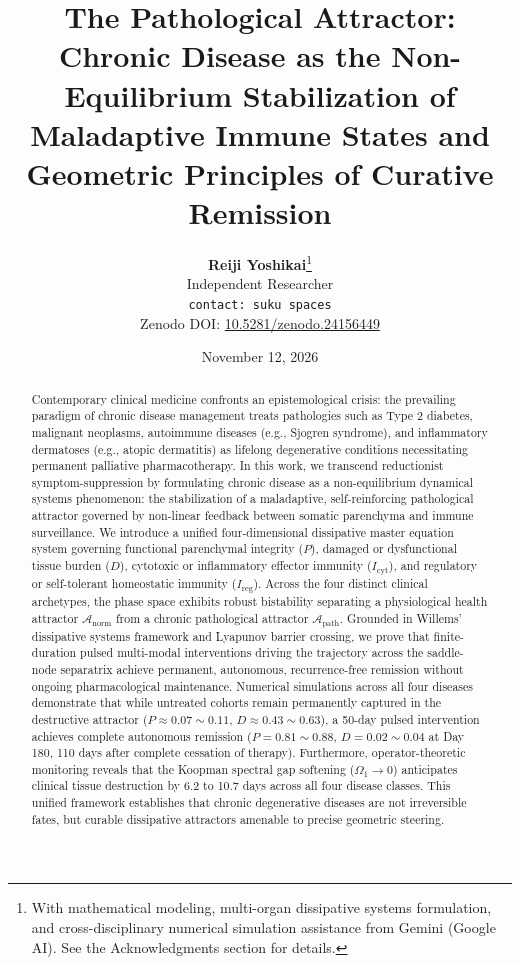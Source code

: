 \documentclass[11pt,a4paper]{article}
\title{\textbf{The Pathological Attractor: Chronic Disease as the Non-Equilibrium Stabilization of Maladaptive Immune States and Geometric Principles of Curative Remission}}
\author{
    \textbf{Reiji Yoshikai}\thanks{With mathematical modeling, multi-organ dissipative systems formulation, and cross-disciplinary numerical simulation assistance from Gemini (Google AI). See the Acknowledgments section for details.} \\
    \small Independent Researcher \\
    \small \texttt{contact: suku spaces} \\
    \small Zenodo DOI: \href{https://doi.org/10.5281/zenodo.24156449}{10.5281/zenodo.24156449}
}
\date{November 12, 2026}
\begin{document}
\maketitle

\begin{abstract}
Contemporary clinical medicine confronts an epistemological crisis: the prevailing paradigm of chronic disease management treats pathologies such as Type 2 diabetes, malignant neoplasms, autoimmune diseases (e.g., Sjogren syndrome), and inflammatory dermatoses (e.g., atopic dermatitis) as lifelong degenerative conditions necessitating permanent palliative pharmacotherapy. In this work, we transcend reductionist symptom-suppression by formulating chronic disease as a non-equilibrium dynamical systems phenomenon: the stabilization of a maladaptive, self-reinforcing pathological attractor governed by non-linear feedback between somatic parenchyma and immune surveillance. We introduce a unified four-dimensional dissipative master equation system governing functional parenchymal integrity ($P$), damaged or dysfunctional tissue burden ($D$), cytotoxic or inflammatory effector immunity ($I_{\mathrm{cyt}}$), and regulatory or self-tolerant homeostatic immunity ($I_{\mathrm{reg}}$). Across the four distinct clinical archetypes, the phase space exhibits robust bistability separating a physiological health attractor $\mathcal{A}_{\mathrm{norm}}$ from a chronic pathological attractor $\mathcal{A}_{\mathrm{path}}$. Grounded in Willems' dissipative systems framework and Lyapunov barrier crossing, we prove that finite-duration pulsed multi-modal interventions driving the trajectory across the saddle-node separatrix achieve permanent, autonomous, recurrence-free remission without ongoing pharmacological maintenance. Numerical simulations across all four diseases demonstrate that while untreated cohorts remain permanently captured in the destructive attractor ($P \approx 0.07 \sim 0.11$, $D \approx 0.43 \sim 0.63$), a 50-day pulsed intervention achieves complete autonomous remission ($P = 0.81 \sim 0.88$, $D = 0.02 \sim 0.04$ at Day 180, 110 days after complete cessation of therapy). Furthermore, operator-theoretic monitoring reveals that the Koopman spectral gap softening ($\Omega_1 \to 0$) anticipates clinical tissue destruction by 6.2 to 10.7 days across all four disease classes. This unified framework establishes that chronic degenerative diseases are not irreversible fates, but curable dissipative attractors amenable to precise geometric steering.
\end{abstract}
\end{document}
